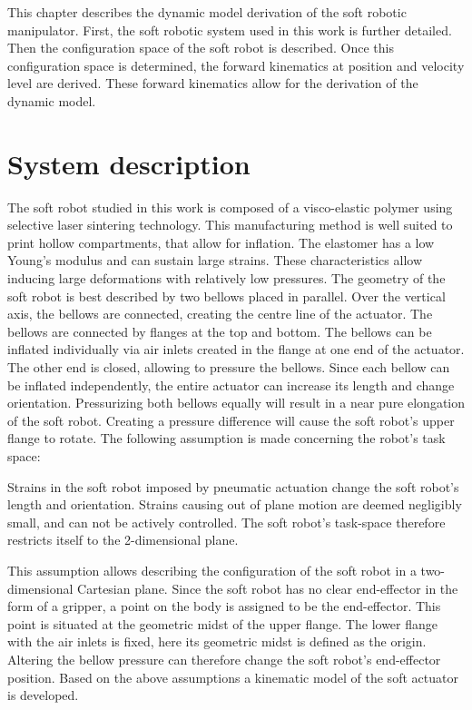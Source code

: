 \label{chap2}

This chapter describes the dynamic model derivation of the soft robotic manipulator. First, the soft robotic system used in this work is further detailed. Then the configuration space of the soft robot is described. Once this configuration space is determined, the forward kinematics at position and velocity level are derived. These forward kinematics allow for the derivation of the dynamic model. 



\section{System description}

The soft robot studied in this work is composed of a visco-elastic polymer using selective laser sintering technology. This manufacturing method is well suited to print hollow compartments, that allow for inflation. The elastomer has a low Young's modulus and can sustain large strains. These characteristics allow inducing large deformations with relatively low pressures. The geometry of the soft robot is best described by two bellows placed in parallel. Over the vertical axis, the bellows are connected, creating the centre line of the actuator. The bellows are connected by flanges at the top and bottom. The bellows can be inflated individually via air inlets created in the flange at one end of the actuator. The other end is closed, allowing to pressure the bellows. Since each bellow can be inflated independently, the entire actuator can increase its length and change orientation. Pressurizing both bellows equally will result in a near pure elongation of the soft robot. Creating a pressure difference will cause the soft robot's upper flange to rotate. The following assumption is made concerning the robot's task space:

\begin{theorem}
Strains in the soft robot imposed by pneumatic actuation change the soft robot's length and orientation. Strains causing out of plane motion are deemed negligibly small, and can not be actively controlled. The soft robot's task-space therefore restricts itself to the 2-dimensional plane.
\end{theorem}

This assumption allows describing the configuration of the soft robot in a two-dimensional Cartesian plane. Since the soft robot has no clear end-effector in the form of a gripper, a point on the body is assigned to be the end-effector. This point is situated at the geometric midst of the upper flange. The lower flange with the air inlets is fixed, here its geometric midst is defined as the origin. Altering the bellow pressure can therefore change the soft robot's end-effector position. Based on the above assumptions a kinematic model of the soft actuator is developed. 


